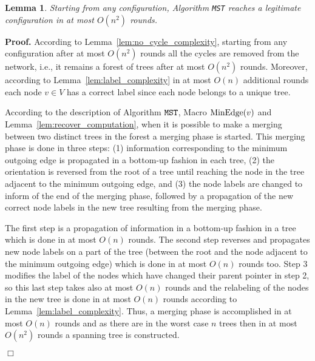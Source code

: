 \documentclass[11pt,a4paper]{article}
\newtheorem{lemma}{Lemma}
\newenvironment{proof}{\noindent \begin{rm}{\textbf{Proof.} }}{\hspace*{\fill}$\Box$\par\end{rm}}
\newcommand{\MinEdge}{\mbox{\rm MinEdge}}
\newcommand{\MST}{\mbox{\tt MST}}
\begin{document}
\begin{lemma}
\label{lem:mst_complexity}
Starting from any configuration, Algorithm \MST\/ reaches a legitimate configuration in at most $O(n^2)$ rounds.
\end{lemma}

\begin{proof}
According to Lemma~\ref{lem:no_cycle_complexity}, starting from any configuration after at most $O(n^2)$ rounds all the cycles are removed from the network, i.e., it remains a forest of trees after at most $O(n^2)$ rounds. Moreover, according to Lemma~\ref{lem:label_complexity} in at most $O(n)$ additional rounds each node $v \in V$ has a correct label since each node belongs to a unique tree.



According to the description of Algorithm $\MST$, Macro $\MinEdge(v)$ and Lemma~\ref{lem:recover_computation}, when it is possible to make a merging between two distinct trees in the forest a merging phase is started. This merging phase is done in three steps: (1) information corresponding to the minimum outgoing edge is propagated in a bottom-up fashion in each tree, (2) the orientation is reversed from the root of a tree until reaching the node in the tree adjacent to the minimum outgoing edge, and (3) the node labels are changed to inform of the end of the merging phase, followed by a propagation of the new correct node labels in the new tree resulting from the merging phase.

The first step is a propagation of information in a bottom-up fashion in a tree which is done in at most $O(n)$ rounds. The second step reverses and propagates new node labels on a part of the tree (between the root and the node adjacent to the minimum outgoing edge) which is done in at most $O(n)$ rounds too. Step 3 modifies the label of the nodes which have changed their parent pointer in step 2, so this last step takes also at most $O(n)$ rounds and the relabeling of the nodes in the new tree is done in at most $O(n)$ rounds according to Lemma~\ref{lem:label_complexity}. Thus, a merging phase is accomplished in at most $O(n)$ rounds and as there are in the worst case $n$ trees then in at most $O(n^2)$ rounds a spanning tree is constructed.


\end{proof}
\end{document}
